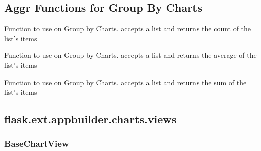 \documentclass[letterpaper,10pt,english]{sphinxmanual}
\begin{document}
\subsection{Aggr Functions for Group By Charts}
\label{api:module-flask.ext.appbuilder.models.group}\label{api:aggr-functions-for-group-by-charts}

\begin{fulllineitems}
\label{api:flask.ext.appbuilder.models.group.aggregate_count}
Function to use on Group by Charts.
accepts a list and returns the count of the list's items

\end{fulllineitems}


\begin{fulllineitems}
\label{api:flask.ext.appbuilder.models.group.aggregate_avg}
Function to use on Group by Charts.
accepts a list and returns the average of the list's items

\end{fulllineitems}


\begin{fulllineitems}
\label{api:flask.ext.appbuilder.models.group.aggregate_sum}
Function to use on Group by Charts.
accepts a list and returns the sum of the list's items

\end{fulllineitems}



\subsection{flask.ext.appbuilder.charts.views}
\label{api:module-flask.ext.appbuilder.charts.views}\label{api:flask-ext-appbuilder-charts-views}

\subsubsection{BaseChartView}
\label{api:basechartview}
\end{document}
